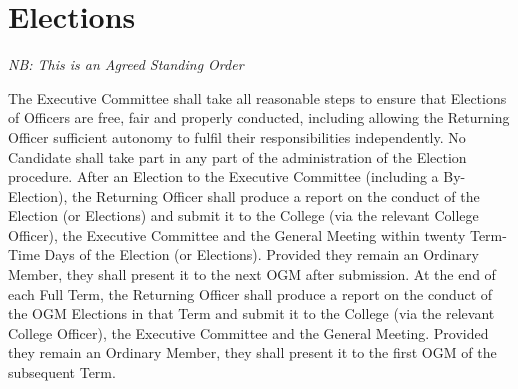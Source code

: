 \chapter{Elections}
\hspace*{-10pt}\textit{NB: This is an Agreed Standing Order}

\npara The Executive Committee shall take all reasonable steps to ensure that Elections of Officers are free, fair and properly conducted, including allowing the Returning Officer sufficient autonomy to fulfil their responsibilities independently.
\npara No Candidate shall take part in any part of the administration of the Election procedure.
\npara After an Election to the Executive Committee (including a By-Election), the Returning Officer shall produce a report on the conduct of the Election (or Elections) and submit it to the College (via the relevant College Officer), the Executive Committee and the General Meeting within twenty Term-Time Days of the Election (or Elections).  Provided they remain an Ordinary Member, they shall present it to the next OGM after submission.
\npara At the end of each Full Term, the Returning Officer shall produce a report on the conduct of the OGM Elections in that Term and submit it to the College (via the relevant College Officer), the Executive Committee and the General Meeting.  Provided they remain an Ordinary Member, they shall present it to the first OGM of the subsequent Term.
